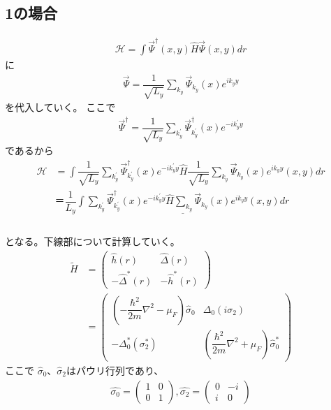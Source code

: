 \documentclass{jarticle}
\begin{document}
\subsection{1の場合}
	\begin{align}
	\mathcal{H}=\int\vec{\Psi}^\dagger(x,y)\hat{H}\vec{\Psi}(x,y)dr
	\end{align}
	に
	\begin{align}
	\vec{\Psi}=\dfrac{1}{\sqrt{L_y}}\displaystyle\sum_{k_y}\vec{\Psi}_{k_y}(x)e^{ik_yy}
	\end{align}
	を代入していく。
	ここで
	\begin{align}
	\vec{\Psi}^\dagger=\dfrac{1}{\sqrt{L_y}}\displaystyle\sum_{k_y^{'}}\vec{\Psi}^\dagger_{k_y^{'}}(x)e^{-ik_y^{'}y}
	\end{align}
	であるから
	\begin{align}
	\mathcal{H}&=\int\dfrac{1}{\sqrt{L_y}}\displaystyle\sum_{k_y^{'}}\vec{\Psi}^\dagger_{k_y^{'}}(x)e^{-ik_y^{'}y}\hat{H}\dfrac{1}{\sqrt{L_y}}\displaystyle\sum_{k_y}\vec{\Psi}_{k_y}(x)e^{ik_yy}(x,y)dr\\&＝\dfrac{1}{L_y}\underline{\int\displaystyle\sum_{k_y^{'}}\vec{\Psi}^\dagger_{k_y^{'}}(x)e^{-ik_y^{'}y}\hat{H}\displaystyle\sum_{k_y}\vec{\Psi}_{k_y}(x)e^{ik_yy}(x,y)dr}\\
	\label{star}
	\end{align}
	\\となる。下線部について計算していく。
	\begin{align}
	\tilde{H}&=
	\begin{pmatrix}
	\hat{h}(r) & \hat{\Delta}(r) \\
	-\hat{\Delta}^{*}(r) & -\hat{h}^{*}(r)
	\end{pmatrix}
	\\&=
	\begin{pmatrix}
	(-\dfrac{\hbar^2}{2m}\nabla^2-\mu_F)\hat{\sigma}_0 & \Delta_0(i\sigma_2) \\
	-\Delta^{*}_0(\sigma^{*}_2) & (\dfrac{\hbar^2}{2m}\nabla^2+\mu_F)\hat{\sigma}^{*}_0
	\end{pmatrix}
	\end{align}
	ここで
	$\hat\sigma_0$、$\hat\sigma_2$はパウリ行列であり、
	\begin{align}
	\hat{\sigma_0}=
	\begin{pmatrix}
	1 & 0 \\
	0 & 1
	\end{pmatrix},
	\hat{\sigma_2}=
	\begin{pmatrix}
	0 & -i \\
	i & 0
	\end{pmatrix}
	\end{align}
\end{document}
